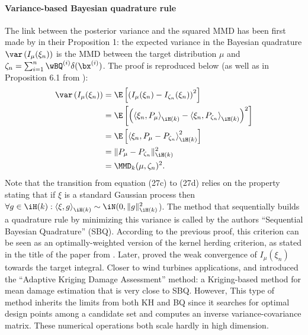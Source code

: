 \paragraph{Variance-based Bayesian quadrature rule}%
The link between the posterior variance and the squared MMD has been first made by \cite{husar_duvenaud_2012} in their Proposition 1: the expected variance in the Bayesian quadrature $\var\left(I_{\mu}(\xi_n)\right)$ is the MMD between the target distribution $\mu$ and $\zeta_n = \sum_{i=1}^n \wBQ^{(i)} \delta(\bx^{(i)})$. 
The proof is reproduced below (as well as in Proposition 6.1 from \cite{motonobu_2018}): %
\begin{subequations}
\begin{align}
    \var\left(I_{\mu}(\xi_n)\right) &= \E\left[ \left(I_{\mu}(\xi_n) - I_{\zeta_n}(\xi_n)\right)^2\right]\\
    &= \E\left[ \left( \left\langle \xi_n, P_{\mu} \right\rangle_{\iH(k)} - \left\langle \xi_n, P_{\zeta_n}\right\rangle_{\iH(k)} \right)^2\right]\\
    &= \E\left[ \left\langle \xi_n, P_{\mu} - P_{\zeta_n} \right\rangle_{\iH(k)}^2\right]\\
    &= \lVert P_{\mu} - P_{\zeta_n} \lVert^2_{\iH(k)}\\ 
    &= \MMD_k(\mu, \zeta_n)^2.
\end{align}
\end{subequations}
Note that the transition from equation (27c) to (27d) relies on the property stating that if $\xi$ is a standard Gaussian process then $\forall g \in \iH(k) : \left\langle \xi, g \right\rangle_{\iH(k)} \sim \iN(0, \lVert g \lVert^2_{\iH(k)}$). 
The method that sequentially builds a quadrature rule by minimizing this variance is called by the authors ``Sequential Bayesian Quadrature'' (SBQ). 
According to the previous proof, this criterion can be seen as an optimally-weighted version of the kernel herding criterion, as stated in the title of the paper from \cite{husar_duvenaud_2012}. 
Later, \cite{briol_2015} proved the weak convergence of $I_{\mu}(\xi_n)$ towards the target integral. 
Closer to wind turbines applications, \cite{huchet_2019} and \cite{huchet_mattrand_2019} introduced the ``Adaptive Kriging Damage Assessment'' method: a Kriging-based method for mean damage estimation that is very close to SBQ. 
However, This type of method inherits the limits from both KH and BQ since it searches for optimal design points among a candidate set and computes an inverse variance-covariance matrix. 
These numerical operations both scale hardly in high dimension. 

